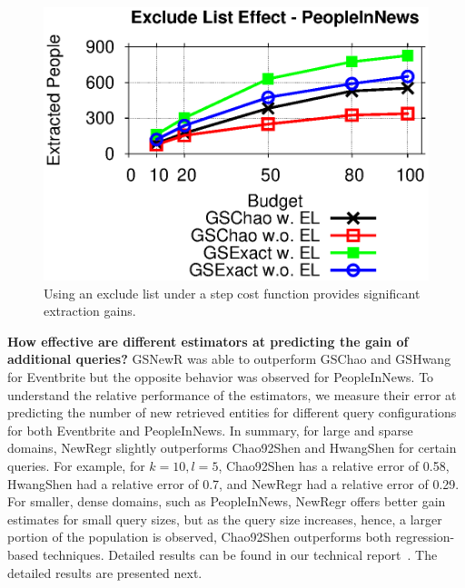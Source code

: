 \begin{figure}[t]
\vspace{-10pt}
	\begin{center}
	\includegraphics[clip,scale=0.35]{figs/exEffect.eps}
	\vspace{-10pt}
	\caption{Using an exclude list under a step cost function provides significant extraction gains.}
	\label{fig:exEffect}
	\end{center}
	\vspace{-15pt}
\end{figure}
\fi

\noindent\textbf{How effective are different estimators at predicting the gain of additional queries?}
GSNewR was able to outperform GSChao and GSHwang for Eventbrite but the opposite behavior was observed for PeopleInNews. To understand the relative performance of the estimators, we measure their error at predicting the number of new retrieved entities for different query configurations for both Eventbrite and PeopleInNews.
In summary, for large and sparse domains, NewRegr slightly outperforms Chao92Shen and HwangShen for certain queries. For example, for $k = 10, l = 5$, Chao92Shen has a relative error of 0.58, HwangShen had a relative error of 0.7, and NewRegr had a relative error of 0.29. For smaller, dense domains, such as PeopleInNews, NewRegr offers better gain estimates for small query sizes, but as the query size increases, hence, a larger portion of the population is observed, Chao92Shen outperforms both regression-based techniques. 
\ifpaper Detailed results can be found in our technical report~\cite{cruxsup}.
\fi
\iftr
The detailed results are presented next.

